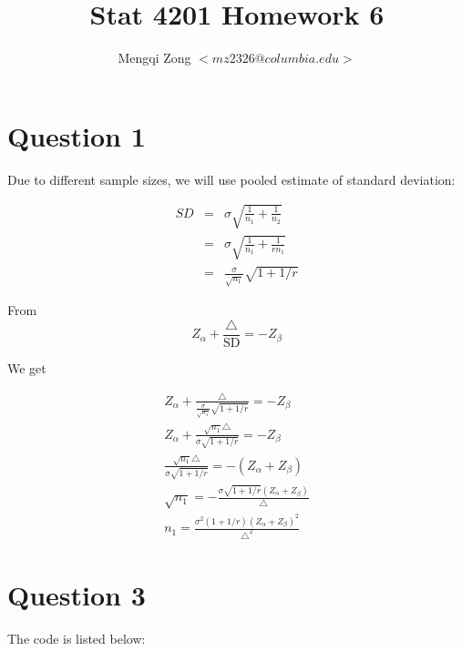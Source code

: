 \documentclass[12pt]{article}
\title{Stat 4201 Homework 6}
\author{Mengqi Zong $<mz2326@columbia.edu>$}
\begin{document}
\maketitle

\setlength{\parindent}{0in}

\section*{Question 1}

Due to different sample sizes, we will use pooled estimate of standard
deviation:

\begin{eqnarray*}
SD
&=& \sigma \sqrt {\frac {1}{n_1} + \frac{1}{n_2}} \\
&=& \sigma \sqrt {\frac {1}{n_1} + \frac{1}{rn_1}} \\
&=& \frac {\sigma}{\sqrt {n_1}} \sqrt {1 + 1 / r} 
\end{eqnarray*}

From
\begin{equation*}
Z_{\alpha} + \frac {\triangle}{\text {SD}} = - Z_{\beta}
\end{equation*}

We get

\begin{eqnarray*}
Z_{\alpha} + \frac {\triangle}{\frac {\sigma}{\sqrt {n_1}} \sqrt {1 +
    1 / r}} = - Z_{\beta} \\
Z_{\alpha} + \frac {\sqrt {n_1} \triangle}{\sigma \sqrt {1 +
    1 / r}} = - Z_{\beta} \\
\frac {\sqrt {n_1} \triangle}{\sigma \sqrt {1 + 1 / r}} = -
(Z_{\alpha} + Z_{\beta}) \\
\sqrt {n_1} = - \frac {\sigma \sqrt {1 + 1 / r}(Z_{\alpha} +
  Z_{\beta})}{\triangle} \\
n_1= \frac {\sigma^2 (1 + 1 / r) (Z_{\alpha} +
  Z_{\beta})^2}{\triangle^2}
\end{eqnarray*}

\section*{Question 3}



\appendix
\appendixpage
\addappheadtotoc

The code is listed below:


\end{document}
